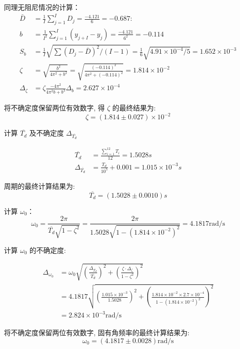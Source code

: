 \documentclass[UTF8]{ctexart}
\begin{document}
同理无阻尼情况的计算：
\begin{align}
    \bar{D}&=\frac{1}{I} \sum_{j=1}^{I} D_{j}=\frac{-4.121}{6}=-0.687:  \nonumber  \\
    b&=\frac{1}{I^{2}} \sum_{j=1}^{I}\left(y_{j+I}-y_{j}\right)=\frac{-4.121}{6^{2}}=-0.114 \nonumber \\
    S_{b}&=\frac{1}{I} \sqrt{\sum\left(D_{j}-\bar{D}\right)^{2} /(I-1)}=\frac{1}{6} \sqrt{4.91\times 10^{-4} /5}=1.652 \times 10^{-3} \nonumber \\
    \zeta&=\sqrt{\frac{b^{2}}{4 \pi^{2}+b^{2}}}=\sqrt{\frac{{(-0.114)}^{2}}{4 \pi^{2}+{(-0.114)}^{2}}}=1.814 \times 10^{-2}\nonumber\\
    \Delta_{\zeta}&=\zeta \frac{-4 \pi^{2}}{4 \pi^{2} b+b^{3}} \Delta_{b}=2.627 \times 10^{-4}\nonumber
\end{align}

将不确定度保留两位有效数字, 得  $\zeta $ 的最终结果为:
    $$
    \zeta=(1.814 \pm 0.027) \times 10^{-2}
    $$

计算 $ \overline{T_{d}} $ 及不确定度 $ \Delta_{\overline{T_{d}}} $

\begin{align}
\overline{T_{d}}&=\frac{\sum_{i=1}^{12} T_{i}}{12}=1.5028 s \nonumber\\
\Delta_{\overline{T_{d}}}&=\frac{T_{d}}{10^{5}}+0.001=1.015 \times 10^{-3} s\nonumber
\end{align}

周期的最终计算结果为:
$$
\overline{T_{d}}=(1.5028 \pm 0.0010) s
$$

计算  $\omega_{0} $：
$$
\omega_{0}=\frac{2 \pi}{\overline{T_{d}} \sqrt{1-\zeta^{2}}}=\frac{2 \pi}{1.5028 \sqrt{1-\left(1.814 \times 10^{-2}\right)^{2}}}=4.1817 \mathrm{rad} / \mathrm{s}
$$

计算  $\omega_{0} $ 的不确定度:

\begin{align}
\Delta_{\omega_{0}}&=\omega_{0} \sqrt{\left(\frac{\Delta_{\overline{T_{d}}}}{\overline{T_{d}}}\right)^{2}+\left(\frac{\zeta \cdot \Delta_{\zeta}}{1-\zeta^{2}}\right)^{2}} \nonumber \\
&=4.1817 \sqrt{\left(\frac{1.015 \times 10^{-3}}{1.5028}\right)^{2}+\left(\frac{1.814 \times 10^{-2} \times 2.7 \times 10^{-4}}{1-\left(1.814 \times 10^{-2}\right)^{2}}\right)^{2}} \nonumber\\
&=2.824 \times 10^{-3} \mathrm{rad} / \mathrm{s} \nonumber
\end{align}

将不确定度保留两位有效数字, 固有角频率的最终计算结果为:
$$
\omega_{0}=(4.1817 \pm 0.0028) \mathrm{rad} / \mathrm{s}
$$
\end{document}
